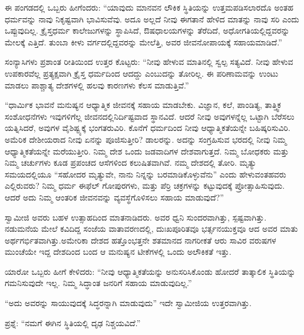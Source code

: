 \vskip 3pt

ಈ ಪಂಗಡದಲ್ಲಿ ಒಬ್ಬರು ಹೀಗೆಂದರು: “ಯಾವುದು ಮಾನವನ ಲೌಕಿಕ ಸ್ಥಿತಿಯನ್ನು ಉತ್ತಮಪಡಿಸಲಾರದೊ ಅಂತಹ ಧರ್ಮವನ್ನು ನಾವು ನಿಕೃಷ್ಟವಾಗಿ ಭಾವಿಸುವೆವು. ಅದೂ ಅಲ್ಲದೆ ನೀವು ಈಗತಾನೆ ಹೇಳಿದ ಮಾತನ್ನು ನಾವು ಸರಿ ಎಂದು ಒಪ್ಪುವುದಿಲ್ಲ. ಕ್ರೈಸ್ತಧರ್ಮ ಕಾಲೇಜುಗಳನ್ನು ಸ್ಥಾಪಿಸಿದೆ, ಔಷಧಾಲಯಗಳನ್ನು ತೆರೆದಿದೆ, ಅಧೋಗತಿಯಲ್ಲಿದ್ದವರನ್ನು ಮೇಲಕ್ಕೆ ಎತ್ತಿದೆ. ತುಂಬಾ ಕೀಳು ವರ್ಗದಲ್ಲಿದ್ದವರನ್ನು ಮೇಲೆತ್ತಿ, ಅವರ ಜೀವನೋಪಾ\-ಯಕ್ಕೆ ಸಹಾಯಮಾಡಿದೆ.”

\vskip 3pt

ಸಂನ್ಯಾಸಿಗಳು ಪ್ರಶಾಂತ ರೀತಿಯಿಂದ ಉತ್ತರ ಕೊಟ್ಟರು: “ನೀವು ಹೇಳುವ ಮಾತಿನಲ್ಲಿ ಸ್ವಲ್ಪ ಸತ್ಯವಿದೆ. ನೀವು ಹೇಳುವ ಉಪಕಾರವೆಲ್ಲ ಪ್ರತ್ಯಕ್ಷವಾಗಿ ಕ್ರೈಸ್ತ ಧರ್ಮದಿಂದ ಆದದ್ದು ಎಂಬುದನ್ನು ತೋರಿಲ್ಲ. ಈ ಪರಿಣಾಮವನ್ನು ಉಂಟು ಮಾಡಲು ಪಾಶ್ಚಾತ್ಯ ದೇಶಗಳಲ್ಲಿ ಹಲವು ಕಾರಣಗಳು ಕೆಲಸ ಮಾಡುತ್ತಿವೆ.”

\vskip 3pt

“ಧಾರ್ಮಿಕ ಭಾವನೆ ಮನುಷ್ಯನ ಆಧ್ಯಾತ್ಮಿಕ ಜೀವನಕ್ಕೆ ಸಹಾಯ ಮಾಡಬೇಕು. ವಿಜ್ಞಾನ, ಕಲೆ, ಪಾಂಡಿತ್ಯ, ತಾತ್ತ್ವಿಕ ಸಂಶೋಧನೆಗಳು ಇವುಗಳಿಗೆಲ್ಲ ಜೀವನದಲ್ಲಿ\break ನಿರ್ದಿಷ್ಟವಾದ ಸ್ಥಾನವಿದೆ. ಆದರೆ ನೀವು ಅವುಗಳನ್ನೆಲ್ಲ ಒಟ್ಟಾಗಿ ಬೆರೆಸಲು ಯತ್ನಿಸಿದರೆ, ಅವುಗಳ ವೈಶಿಷ್ಟ್ಯಕ್ಕೆ ಭಂಗತರುವಿರಿ. ಕೊನೆಗೆ ಧರ್ಮದಿಂದ ನೀವು ಆಧ್ಯಾತ್ಮಿಕತೆಯನ್ನೇ ಬಹಿಷ್ಕರಿಸುವಿರಿ. ಅಮೆರಿಕ ದೇಶೀಯರಾದ ನೀವು ಏನನ್ನು ಪೂಜಿಸುತ್ತೀರಿ? ಡಾಲರನ್ನು. ಅದನ್ನು ಸಂಗ್ರಹಿಸುವ ಭರದಲ್ಲಿ ನೀವು ನಿಮ್ಮ ಆಧ್ಯಾತ್ಮಿಕತೆಯನ್ನೇ ಮರೆಯುತ್ತೀರಿ. ನಿಮ್ಮ ದೇಶ ಒಂದು ಜಡವಾದಿಗಳ ದೇಶವಾಗುತ್ತದೆ. ನಿಮ್ಮ ಬೋಧಕರು ಮತ್ತು ನಿಮ್ಮ ಚರ್ಚುಗಳು ಕೂಡ ಪ್ರಪಂಚದ ಆಸೆಗಳಿಂದ ಕಲುಷಿತವಾಗಿವೆ. ನಮ್ಮ ದೇಶದಲ್ಲಿ ತೋರಿ. ಮೃತ್ಯು ಸಮಯದಲ್ಲಿಯೂ “ಸಹೋದರ ಮೃತ್ಯುವೇ, ನಾನು ನಿನ್ನನ್ನು ಬರಮಾಡಿಕೊಳ್ಳುವೆನು” ಎಂದು ಹೇಳುವಂತಹವರು ಎಲ್ಲಿರುವರು? ನಿಮ್ಮ ಧರ್ಮ ಈಫೆಲ್​ ಗೋಪುರಗಳು, ಮತ್ತು ಪೆರ್ರಿ ಚಕ್ರಗಳನ್ನು ಕಟ್ಟುವುದಕ್ಕೆ ಪ್ರೋತ್ಸಾಹಿಸುವುದು. ಆದರೆ ಅದು ನಿಮ್ಮ ಆಂತರಿಕ ಜೀವನವನ್ನು ವ್ಯವಸ್ಥೆಗೊಳಿಸಲು ಸಹಾಯ ಮಾಡುವುದೆ?”

\vskip 3pt

ಸ್ವಾಮೀಜಿ ಅವರು ಬಹಳ ಉತ್ಸಾಹದಿಂದ ಮಾತನಾಡಿದರು. ಅವರ ಧ್ವನಿ ಸುಂದರವಾಗಿತ್ತು, ಸ್ಪಷ್ಟವಾಗಿತ್ತು. ನಡುಮನೆಯ ಮೇಲೆ ಕವಿದಿದ್ದ ಸಂಜೆಯ ವಾತಾವರಣದಲ್ಲಿ, ದುಃಖಪೂರಿತವೂ ಭರ್ತ್ಸನಯುಕ್ತವೂ ಆದ ಅವರ ಮಾತು ಅರ್ಥಗರ್ಭಿತವಾಗಿತ್ತು.\break ಅಮೇರಿಕಾ ದೇಶದ ಹತ್ತೊಂಭತ್ತನೇ ಶತಮಾನದ ನಾಗರೀಕತೆ ಆರು ಸಾವಿರ ವರುಷಗಳ ಮುಂಚೆಯೇ ಇದ್ದ ದೇಶದಿಂದ ಬಂದ ಆ ಮನುಷ್ಯನ ಟೀಕೆಗಳಲ್ಲಿ ಒಂದು ಅಲೌಕಿಕತೆ ಇತ್ತು.

\vskip 3pt

ಯಾರೋ ಒಬ್ಬರು ಹೀಗೆ ಕೇಳಿದರು: “ನೀವು ಆಧ್ಯಾತ್ಮಿಕತೆಯನ್ನು ಅನುಸರಿಸಿಕೊಂಡು ಹೋದರೆ ತಾತ್ಕಾಲಿಕ ಸ್ಥಿತಿಯನ್ನು ಗಮನಿಸುವುದೇ ಇಲ್ಲ. ನಿಮ್ಮ ಸಿದ್ಧಾಂತ ಜನರಿಗೆ ಸಹಾಯ ಮಾಡುವುದಿಲ್ಲ.”

\vskip 3pt

“ಅದು ಅವರನ್ನು ಸಾಯುವುದಕ್ಕೆ ಸಿದ್ಧರನ್ನಾಗಿ ಮಾಡುವುದು” ಇದೇ ಸ್ವಾಮೀಜಿಯ ಉತ್ತರವಾಗಿತ್ತು.

\vskip 3pt

ಪ್ರಶ್ನೆ: “ನಮಗೆ ಈಗಿನ ಸ್ಥಿತಿಯಲ್ಲಿ ದೃಢ ನಿಶ್ಚಯವಿದೆ.”

